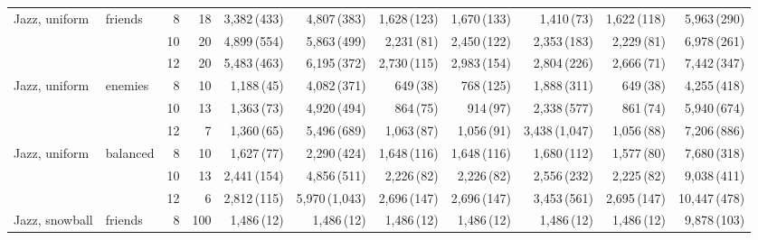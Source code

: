 \begin{table}[p]
{\begin{tabular}{llrrrrrrrrr}
\midrule
Jazz, uniform & friends & 8 & 18 & 3,382\,{\scriptsize(433)} & 4,807\,{\scriptsize(383)} & 1,628\,{\scriptsize(123)} & 1,670\,{\scriptsize(133)} & 1,410\,{\scriptsize(73)} & 1,622\,{\scriptsize(118)} & 5,963\,{\scriptsize(290)} \\
 &  & 10 & 20 & 4,899\,{\scriptsize(554)} & 5,863\,{\scriptsize(499)} & 2,231\,{\scriptsize(81)} & 2,450\,{\scriptsize(122)} & 2,353\,{\scriptsize(183)} & 2,229\,{\scriptsize(81)} & 6,978\,{\scriptsize(261)} \\
 &  & 12 & 20 & 5,483\,{\scriptsize(463)} & 6,195\,{\scriptsize(372)} & 2,730\,{\scriptsize(115)} & 2,983\,{\scriptsize(154)} & 2,804\,{\scriptsize(226)} & 2,666\,{\scriptsize(71)} & 7,442\,{\scriptsize(347)} \\
\addlinespace[1pt]
Jazz, uniform & enemies & 8 & 10 & 1,188\,{\scriptsize(45)} & 4,082\,{\scriptsize(371)} & 649\,{\scriptsize(38)} & 768\,{\scriptsize(125)} & 1,888\,{\scriptsize(311)} & 649\,{\scriptsize(38)} & 4,255\,{\scriptsize(418)} \\
 &  & 10 & 13 & 1,363\,{\scriptsize(73)} & 4,920\,{\scriptsize(494)} & 864\,{\scriptsize(75)} & 914\,{\scriptsize(97)} & 2,338\,{\scriptsize(577)} & 861\,{\scriptsize(74)} & 5,940\,{\scriptsize(674)} \\
 &  & 12 & 7 & 1,360\,{\scriptsize(65)} & 5,496\,{\scriptsize(689)} & 1,063\,{\scriptsize(87)} & 1,056\,{\scriptsize(91)} & 3,438\,{\scriptsize(1,047)} & 1,056\,{\scriptsize(88)} & 7,206\,{\scriptsize(886)} \\
\addlinespace[1pt]
Jazz, uniform & balanced & 8 & 10 & 1,627\,{\scriptsize(77)} & 2,290\,{\scriptsize(424)} & 1,648\,{\scriptsize(116)} & 1,648\,{\scriptsize(116)} & 1,680\,{\scriptsize(112)} & 1,577\,{\scriptsize(80)} & 7,680\,{\scriptsize(318)} \\
 &  & 10 & 13 & 2,441\,{\scriptsize(154)} & 4,856\,{\scriptsize(511)} & 2,226\,{\scriptsize(82)} & 2,226\,{\scriptsize(82)} & 2,556\,{\scriptsize(232)} & 2,225\,{\scriptsize(82)} & 9,038\,{\scriptsize(411)} \\
 &  & 12 & 6 & 2,812\,{\scriptsize(115)} & 5,970\,{\scriptsize(1,043)} & 2,696\,{\scriptsize(147)} & 2,696\,{\scriptsize(147)} & 3,453\,{\scriptsize(561)} & 2,695\,{\scriptsize(147)} & 10,447\,{\scriptsize(478)} \\
\midrule
Jazz, snowball & friends & 8 & 100 & 1,486\,{\scriptsize(12)} & 1,486\,{\scriptsize(12)} & 1,486\,{\scriptsize(12)} & 1,486\,{\scriptsize(12)} & 1,486\,{\scriptsize(12)} & 1,486\,{\scriptsize(12)} & 9,878\,{\scriptsize(103)} \\

\end{tabular}}
\end{table}

